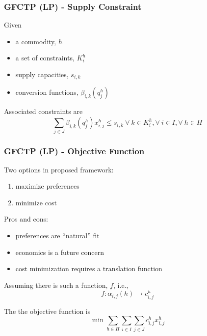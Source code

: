 \begin{frame}[ctb!]
  \frametitle{GFCTP (LP) - Supply Constraint}

  Given
  \begin{itemize}
    \item a commodity, $h$
    \item a set of constraints, $K_i^h$
    \item supply capacities, $s_{i,k}$
    \item conversion functions, $\beta_{i,k}(q_{j}^{h})$
  \end{itemize}

  Associated constraints are
  \begin{equation}
    \sum_{j \in J}\beta_{i,k}(q_{j}^{h}) x_{i,j}^{h} \leq s_{i,k} 
    \: \forall \: k \in K_{i}^{h},  
    \forall \: i \in I, \forall \: h \in H
  \end{equation}

\end{frame}

\begin{frame}[ctb!]
  \frametitle{GFCTP (LP) - Objective Function}

  Two options in proposed framework:
  \begin{enumerate}
    \item maximize preferences
    \item minimize cost
  \end{enumerate}

  Pros and cons:
  \begin{itemize}
    \item preferences are ``natural'' fit
    \item economics is a future concern
    \item cost minimization requires a translation function
  \end{itemize}

  Assuming there is such a function, $f$, i.e.,
  \begin{equation}
    f : \alpha_{i,j}(h) \to c_{i,j}^{h}
  \end{equation}

  The the objective function is
  \begin{equation}
    \min \sum_{h \in H}\sum_{i \in I}\sum_{j \in J}c_{i,j}^{h} x_{i,j}^{h} 
  \end{equation}

\end{frame}

